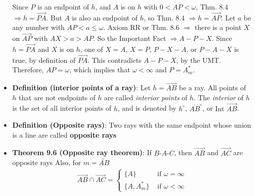 \documentclass{report}
\begin{document}
\begin{itemize}
            Since \( P \) is an endpoint of \( h \), and \( A \) is on \( h \) with \( 0 < AP < \omega \),  
            Thm. 8.4 \( \Rightarrow h = \overrightarrow{PA} \).  
            \bigbreak \noindent 
            But \( A \) is also an endpoint of \( h \), so Thm. 8.4 \( \Rightarrow h = \overrightarrow{AP} \).
            \bigbreak \noindent 
            Let \( a \) be any number with \( AP < a \leq \omega \).
            \bigbreak \noindent 
            Axiom RR or Thm. 8.6 \( \Rightarrow \) there is a point \( X \) on \( \overrightarrow{AP} \) with  
            \( AX > a > AP \). So the Important Fact \( \Rightarrow A - P - X \).
            \bigbreak \noindent 
            Since \( h = \overrightarrow{PA} \) and \( X \) is on \( h \),  
            one of \( X = A \), \( X = P \), \( P - X - A \), or \( P - A - X \) is true, by definition of \( \overrightarrow{PA} \).  
            This contradicts \( A - P - X \), by the UMT.
            \bigbreak \noindent 
            Therefore, \( AP = \omega \), which implies that  
            \( \omega < \infty \) and \( P = A_m^* \).
        \item \textbf{Definition (interior points of a ray)}: Let \( h = \overrightarrow{AB} \) be a ray.  
            All points of \( h \) that are not endpoints of \( h \) are called \textit{interior points} of \( h \).  
            \bigbreak \noindent 
            The \textit{interior} of \( h \) is the set of all interior points of \( h \),  
            and is denoted by \( h^\circ \), \( \overline{AB}^\circ \), or \( \text{Int } \overrightarrow{AB} \).
        \item \textbf{Definition (Opposite rays)}: Two rays with the same endpoint whose union is a line are called \textbf{opposite rays}
        \item \textbf{Theorem 9.6 (Opposite ray theorem)}: If $ B\text{-}A\text{-}C$, then $\overrightarrow{AB}$ and $\overrightarrow{AC}$ are opposite rays
            \bigbreak \noindent 
            Also, for $m = \overleftrightarrow{AB}$
            \begin{align*}
                \overrightarrow{AB} \cap \overrightarrow{AC} = 
                \begin{cases}
                    \{A\}     & \text{ if } \omega = \infty \\
                    \{A, A_{m}^{*}\}     & \text{ if } \omega<\infty
                \end{cases}
            \end{align*}
            \bigbreak \noindent 

\end{itemize}
\end{document}
